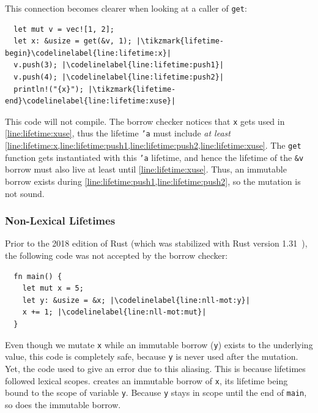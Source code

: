 \documentclass[sigplan,11pt,screen,nonacm]{acmart}
\newcounter{codeline}
\newcommand*{\codelinelabel}[1]{
  \refstepcounter{codeline}
  \setcounter{codeline}{\value{FancyVerbLine}}
  \label[codeline]{#1}
}
\begin{document}
This connection becomes clearer when looking at a caller of \texttt{get}:
\begin{verbatim}
  let mut v = vec![1, 2];
  let x: &usize = get(&v, 1); |\tikzmark{lifetime-begin}\codelinelabel{line:lifetime:x}|
  v.push(3); |\codelinelabel{line:lifetime:push1}|
  v.push(4); |\codelinelabel{line:lifetime:push2}|
  println!("{x}"); |\tikzmark{lifetime-end}\codelinelabel{line:lifetime:xuse}|
\end{verbatim}
This code will not compile. The borrow checker notices that \texttt{x} gets used in \cref*{line:lifetime:xuse}, thus the lifetime \texttt{'a} must include \emph{at least} \cref*{line:lifetime:x,line:lifetime:push1,line:lifetime:push2,line:lifetime:xuse}. The \texttt{get} function gets instantiated with this \texttt{'a} lifetime, and hence the lifetime of the \texttt{&v} borrow must also live at least until \cref*{line:lifetime:xuse}. Thus, an immutable borrow exists during \cref*{line:lifetime:push1,line:lifetime:push2}, so the mutation is not sound.

\subsubsection{Non-Lexical Lifetimes} \label{sec:rust:nll}

Prior to the 2018 edition of Rust (which was stabilized with Rust version 1.31~\cite{rust:2018-release}), the following code was not accepted by the borrow checker:
\begin{verbatim}
  fn main() {
    let mut x = 5;
    let y: &usize = &x; |\codelinelabel{line:nll-mot:y}|
    x += 1; |\codelinelabel{line:nll-mot:mut}|
  }
\end{verbatim}
Even though we mutate \texttt{x} while an immutable borrow (\texttt{y}) exists to the underlying value, this code is completely safe, because \texttt{y} is never used after the mutation. Yet, the code used to give an error due to this aliasing. This is because lifetimes followed lexical scopes.  creates an immutable borrow of \texttt{x}, its lifetime being bound to the scope of variable \texttt{y}. Because \texttt{y} stays in scope until the end of \texttt{main}, so does the immutable borrow.
\end{document}
